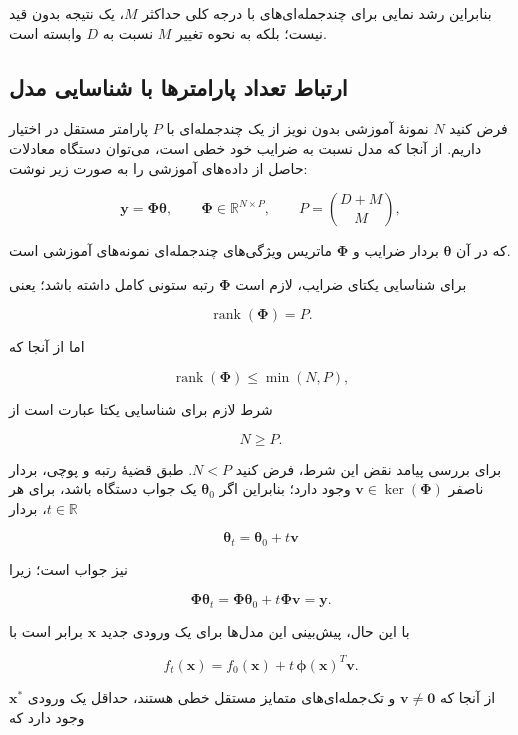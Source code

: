 \documentclass[12pt,a4paper]{article}
\begin{document}
بنابراین رشد نمایی برای چندجمله‌ای‌های
با درجه کلی حداکثر $M$، یک نتیجه
بدون قید نیست؛ بلکه به نحوه تغییر
$M$ نسبت به $D$ وابسته است.



\subsection{ارتباط تعداد پارامترها با شناسایی مدل}

فرض کنید $N$ نمونۀ آموزشی بدون نویز از یک
چندجمله‌ای با $P$ پارامتر مستقل در اختیار داریم.
از آنجا که مدل نسبت به ضرایب خود خطی است،
می‌توان دستگاه معادلات حاصل از داده‌های آموزشی
را به صورت زیر نوشت:

\[
\mathbf{y}=\boldsymbol{\Phi}\boldsymbol{\theta},
\qquad
\boldsymbol{\Phi}\in\mathbb{R}^{N\times P},
\qquad
P=\binom{D+M}{M},
\]

که در آن $\boldsymbol{\theta}$ بردار ضرایب و
$\boldsymbol{\Phi}$ ماتریس ویژگی‌های چندجمله‌ای
نمونه‌های آموزشی است.

برای شناسایی یکتای ضرایب، لازم است
$\boldsymbol{\Phi}$ رتبه ستونی کامل داشته باشد؛ یعنی

\[
\operatorname{rank}(\boldsymbol{\Phi})=P.
\]

اما از آنجا که

\[
\operatorname{rank}(\boldsymbol{\Phi})
\leq \min(N,P),
\]

شرط لازم برای شناسایی یکتا عبارت است از

\[
\boxed{N\geq P.}
\]

برای بررسی پیامد نقض این شرط، فرض کنید $N<P$.
طبق قضیۀ رتبه و پوچی، بردار ناصفر
$\mathbf{v}\in\ker(\boldsymbol{\Phi})$
وجود دارد؛ بنابراین اگر
$\boldsymbol{\theta}_0$ یک جواب دستگاه باشد،
برای هر $t\in\mathbb{R}$، بردار

\[
\boldsymbol{\theta}_t
=
\boldsymbol{\theta}_0+t\mathbf{v}
\]

نیز جواب است؛ زیرا

\[
\boldsymbol{\Phi}\boldsymbol{\theta}_t
=
\boldsymbol{\Phi}\boldsymbol{\theta}_0
+t\boldsymbol{\Phi}\mathbf{v}
=\mathbf{y}.
\]

با این حال، پیش‌بینی این مدل‌ها برای
یک ورودی جدید $\mathbf{x}$ برابر است با

\[
\boxed{
f_t(\mathbf{x})
=
f_0(\mathbf{x})
+t\,\boldsymbol{\phi}(\mathbf{x})^T\mathbf{v}.
}
\]

از آنجا که $\mathbf{v}\neq\mathbf{0}$
و تک‌جمله‌ای‌های متمایز مستقل خطی هستند،
حداقل یک ورودی $\mathbf{x}^{*}$ وجود دارد که
\end{document}
